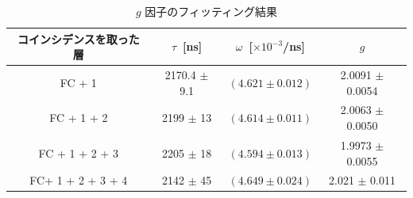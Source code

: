 \begin{table}[H]
\caption{$g$ 因子のフィッティング結果}
\label{fit_g}
\centering
\begin{tabular}{cccc}\toprule
コインシデンスを取った層 & $\tau$~[ns] & $\omega$~[$\times 10^{-3}$/ns] & $g$ \\ \midrule
FC + 1 & 2170.4 $\pm$ 9.1 & $ (4.621 \pm 0.012) $ & 2.0091 $\pm$ 0.0054 \\
FC + 1 + 2 & 2199 $\pm$ 13 & $ (4.614 \pm 0.011) $ & 2.0063 $\pm$ 0.0050 \\
FC + 1 + 2 + 3 & 2205 $\pm$ 18 & $ (4.594 \pm 0.013) $ & 1.9973 $\pm$ 0.0055\\
FC+ 1 + 2 + 3 + 4 & 2142 $\pm$ 45 & $ (4.649 \pm 0.024) $ & 2.021 $\pm$ 0.011 \\ \bottomrule
\end{tabular}
\end{table}%

